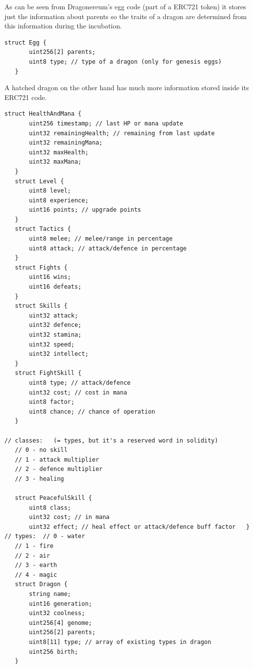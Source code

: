 \documentclass[12pt]{article}
\begin{document}
As can be seen from Dragonereum’s egg code (part of a ERC721 token) it stores just the information about parents so the traits of a dragon are determined from this information during the incubation.\par



\begin{footnotesize}
\begin{verbatim}
struct Egg {
       uint256[2] parents;
       uint8 type; // type of a dragon (only for genesis eggs)
   }

\end{verbatim}
\end{footnotesize}

A hatched dragon on the other hand has much more information stored inside its ERC721 code.\par

\begin{footnotesize}
\begin{verbatim}
struct HealthAndMana {
       uint256 timestamp; // last HP or mana update
       uint32 remainingHealth; // remaining from last update
       uint32 remainingMana;
       uint32 maxHealth;
       uint32 maxMana;
   }
   struct Level {
       uint8 level;
       uint8 experience;
       uint16 points; // upgrade points
   }
   struct Tactics {
       uint8 melee; // melee/range in percentage
       uint8 attack; // attack/defence in percentage   
   }
   struct Fights {
       uint16 wins;
       uint16 defeats;
   }
   struct Skills {
       uint32 attack;
       uint32 defence;
       uint32 stamina;
       uint32 speed;
       uint32 intellect;
   }
   struct FightSkill {
       uint8 type; // attack/defence       
       uint32 cost; // cost in mana
       uint8 factor;
       uint8 chance; // chance of operation
   }
   
// classes:   (= types, but it's a reserved word in solidity)
   // 0 - no skill
   // 1 - attack multiplier
   // 2 - defence multiplier
   // 3 - healing

   struct PeacefulSkill {
       uint8 class;
       uint32 cost; // in mana
       uint32 effect; // heal effect or attack/defence buff factor   }
// types:  // 0 - water
   // 1 - fire
   // 2 - air
   // 3 - earth
   // 4 - magic
   struct Dragon {
       string name;
       uint16 generation;
       uint32 coolness;
       uint256[4] genome;
       uint256[2] parents;
       uint8[11] type; // array of existing types in dragon
       uint256 birth;
   }

\end{verbatim}
\end{footnotesize}
\end{document}
